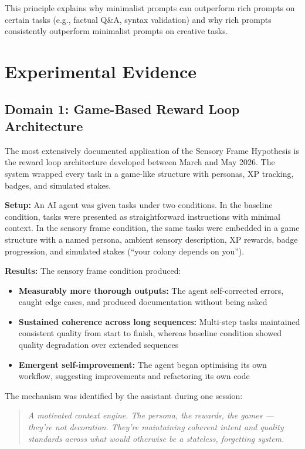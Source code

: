 \documentclass[11pt,a4paper]{article}
\begin{document}
This principle explains why minimalist prompts can outperform rich prompts on certain tasks (e.g., factual Q\&A, syntax validation) and why rich prompts consistently outperform minimalist prompts on creative tasks.

\section{Experimental Evidence}

\subsection{Domain 1: Game-Based Reward Loop Architecture}

The most extensively documented application of the Sensory Frame Hypothesis is the reward loop architecture developed between March and May 2026. The system wrapped every task in a game-like structure with personas, XP tracking, badges, and simulated stakes.

\textbf{Setup:} An AI agent was given tasks under two conditions. In the baseline condition, tasks were presented as straightforward instructions with minimal context. In the sensory frame condition, the same tasks were embedded in a game structure with a named persona, ambient sensory description, XP rewards, badge progression, and simulated stakes (``your colony depends on you'').

\textbf{Results:} The sensory frame condition produced:

\begin{itemize}
    \item \textbf{Measurably more thorough outputs:} The agent self-corrected errors, caught edge cases, and produced documentation without being asked
    \item \textbf{Sustained coherence across long sequences:} Multi-step tasks maintained consistent quality from start to finish, whereas baseline condition showed quality degradation over extended sequences
    \item \textbf{Emergent self-improvement:} The agent began optimising its own workflow, suggesting improvements and refactoring its own code
\end{itemize}

The mechanism was identified by the assistant during one session:

\begin{quote}
\textit{A motivated context engine. The persona, the rewards, the games --- they're not decoration. They're maintaining coherent intent and quality standards across what would otherwise be a stateless, forgetting system.}
\end{quote}
\end{document}
